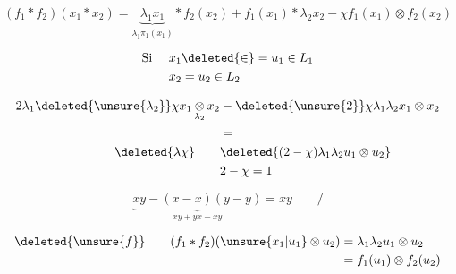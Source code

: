 \[
\boxed{(f_1\ast f_2)(x_1\ast x_2)=
\underbrace{\lambda_1x_1}_{\lambda_1\pi_1(x_1)}\ast f_2(x_2)
+f_1(x_1)\ast\lambda_2 x_2-\chi f_1(x_1)\otimes f_2(x_2)}
\]


\[
\begin{aligned}
\text{Si }\quad x_1&\deleted{\in}=u_1\in L_1\\
x_2&=u_2\in L_2
\end{aligned}
\]

\[
\begin{aligned}
2\lambda_1\deleted{\unsure{\lambda_2}}\chi x_1\mathop{\otimes}_{\lambda_2}x_2
 &-\deleted{\unsure{2}}\chi\lambda_1\lambda_2 x_1\otimes x_2\\
 &=\\
\deleted{\lambda\chi}\qquad&\deleted{(2-\chi)\lambda_1\lambda_2 u_1\otimes u_2}\\
&2-\chi=1
\end{aligned}
\]

\[
\underbrace{xy-(x-x)(y-y)}_{xy+yx-xy}=xy\qquad\Big/
\]

\[
\begin{aligned}
\deleted{\unsure{f}}\qquad (f_1\ast f_2)(\unsure{x_1|u_1}\otimes u_2)&=\lambda_1\lambda_2 u_1\otimes u_2\\
 &=f_1(u_1)\otimes f_2(u_2)
\end{aligned}
\]

